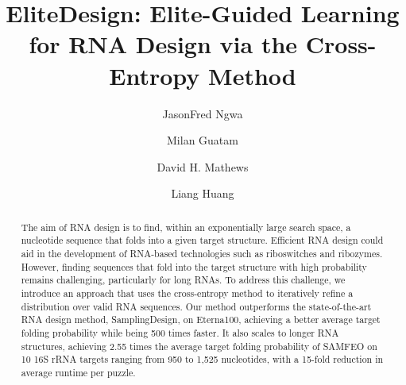\documentclass[10pt,letterpaper]{article}
\title{EliteDesign: Elite-Guided Learning for RNA Design via the Cross-Entropy Method}
\author{JasonFred Ngwa \and Milan Guatam \and David H. Mathews \and Liang Huang}
\date{}
\begin{document}
\maketitle

\begin{abstract}
    The aim of RNA design is to find, within an exponentially large search space,
    a nucleotide sequence that folds into a given target structure. Efficient RNA design could aid in
    the development of RNA-based technologies such as riboswitches and ribozymes. However, 
    finding sequences that fold into the target structure with high probability remains challenging, 
    particularly for long RNAs. To address this challenge, we introduce an approach that uses the 
    cross-entropy method to iteratively refine a distribution over valid RNA sequences. Our method outperforms 
    the state-of-the-art RNA design method, SamplingDesign, on Eterna100, achieving a better average target folding probability
    while being 500 times faster. It also scales to longer RNA structures, achieving 2.55 times the average target folding probability 
    of SAMFEO on 10 16S rRNA targets ranging from 950 to 1,525 nucleotides, with a 15-fold reduction in average runtime per puzzle.
\end{abstract}
\end{document}
